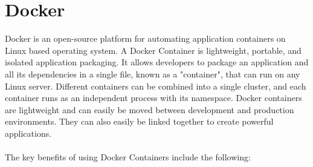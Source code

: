 \documentclass[MMR,Master,nenglish]{twbook}%
\begin{document}
\section{Docker}
Docker is an open-source platform for automating application containers on Linux based operating system. A Docker Container is lightweight, portable, and isolated application packaging. It allows developers to package an application and all its dependencies in a single file, known as a "container", that can run on any Linux server. Different containers can be combined into a single cluster, and each container runs as an independent process with its namespace. Docker containers are lightweight and can easily be moved between development and production environments. They can also easily be linked together to create powerful applications.\cite{rad2017}
\\
\\
The key benefits of using Docker Containers include the following: 
\end{document}
